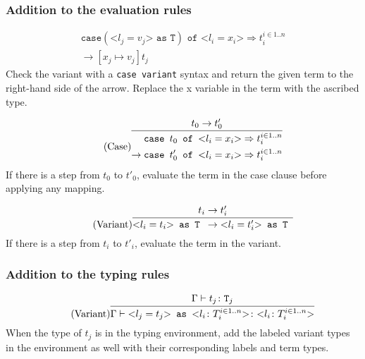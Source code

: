 \subsubsection{Addition to the evaluation rules \cite{pierce2002ProgLang}}
\begin{equation*}
    \tag{Case variant}
    \begin{split}
        \texttt{case} (\text{<}l_j=v_j\text{>} \texttt{ as } \texttt{T}) \texttt{ of } \text{<}l_i=x_i\text{>} \Rightarrow t_i^{i \in 1..n} \\
        \rightarrow [x_j \mapsto v_j]t_j
    \end{split}
\end{equation*}
Check the variant with a \texttt{case variant} syntax and return
the given term to the right-hand side of the arrow. Replace the
x variable in the term with the ascribed type.

\begin{equation*}
    \tag{Case}
    \infer{
        \begin{split}
            \texttt{case } t_0 \texttt{ of } \text{<}l_i=x_i\text{>} \Rightarrow t_i^{i \in 1..n} \\
            \rightarrow \texttt{case } t'_0 \texttt{ of } \text{<}l_i=x_i\text{>} \Rightarrow t_i^{i \in 1..n}
        \end{split}
    }{
        t_0 \rightarrow t'_0
    }
\end{equation*}
If there is a step from $t_0$ to $t'_0$, evaluate the term
in the case clause before applying any mapping.

\begin{equation*}
    \tag{Variant}
    \infer{
        \text{<}l_i=t_i\text{>} \texttt{ as T } \rightarrow \text{<}l_i=t'_i\text{>} \texttt{ as T }
    }{
        t_i \rightarrow t'_i
    }
\end{equation*}
If there is a step from $t_i$ to $t'_i$, evaluate the term
in the variant.

\subsubsection{Addition to the typing rules \cite{pierce2002ProgLang}}
\begin{equation*}
    \tag{Variant}
    \infer{
    \Gamma \vdash \text{<}l_j=t_j\text{>} \texttt{ as } \text{<}l_i \colon T_i^{i \in 1..n}\text{>} \colon \text{<}l_i \colon T_i^{i \in 1..n}\text{>}
    }{
    \Gamma \vdash t_j \colon \texttt{T}_j
    }
\end{equation*}
When the type of $t_j$ is in the typing environment, add the labeled
variant types in the environment as well with their corresponding labels and
term types.

